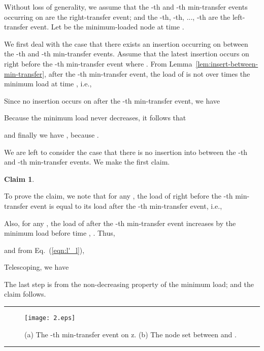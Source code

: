 \documentclass[a4paper]{article}
\newtheorem{claim}{Claim}
\newenvironment{proof}{{\bf Proof:}}{\hfill\rule{1.5mm}{3mm}\vspace{0.1in}}
\begin{document}
\begin{proof}
  Without loss of generality, we assume that the -th and 
  -th min-transfer events occurring on  are the
  right-transfer event; and the -th, -th, ...,
  -th are the left-transfer event.  Let  be the
  minimum-loaded node at time .

  We first deal with the case that there exists an insertion occurring
  on  between the -th and  -th min-transfer events.
  Assume that the latest insertion occurs on  right before the
  -th min-transfer event where . From
  Lemma~\ref{lem:insert-between-min-transfer}, after the -th
  min-transfer event, the load of  is not over  times 
  the minimum load at time , i.e.,
	
  

  Since no insertion occurs on  after the -th min-transfer
  event, we have 
	
  
	
  Because the minimum load never decreases, it follows that
	
  

  and finally we have , because .
		
  We are left to consider the case that there is no insertion into 
  between the -th and  -th min-transfer events.  We
  make the first claim.
    
  \begin{claim}\label{clamin:1}
  
\end{claim}
\begin{proof}
  To prove the claim, we note that for any , the load
  of  right before the -th min-transfer event is equal to its
  load after the -th min-transfer event, i.e.,

    

  Also, for any , the load of  after the
  -th min-transfer event increases by the minimum load before time
  , .  Thus,

    

  and from Eq.~(\ref{eqn:l'_l}),

  

  Telescoping, we have
  
  The last step is from the non-decreasing property of the minimum
  load; and the claim follows.
\end{proof}


\begin{figure}
    \centering \texttt{[image: 2.eps]}
    \caption{(a) The -th min-transfer event on z. (b) The node set
       between  and .}
    \label{fig:2}
  \end{figure}


\end{proof}
\end{document}
